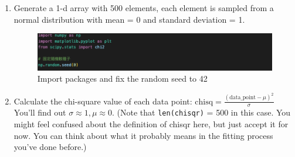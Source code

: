 \documentclass[12pt,a4paper]{article}
\begin{document}
\begin{CJK}{UTF8}{bkai}
\begin{enumerate}
    \item Generate a 1-d array with 500 elements, each element is sampled from a normal distribution with mean = 0 and standard deviation = 1.
    \begin{figure}[h]
        \centering
        \includegraphics[width=1\linewidth]{figures/code/code_2_1.png}
        \caption{Import packages and fix the random seed to 42}
        \label{fig:code_2_1}
    \end{figure}
    \item Calculate the chi-square value of each data point:
    $\text{chisq} = \frac{(\text{data\_point} - \mu)^2}{\sigma}$
    You'll find out \(\sigma \approx 1, \mu \approx 0\). (Note that \texttt{len(chisqr)} = 500 in this case. You might feel confused about the definition of chisqr here, but just accept it for now. You can think about what it probably means in the fitting process you've done before.)
    

\end{enumerate}
\end{CJK}
\end{document}
